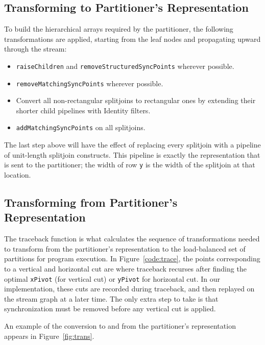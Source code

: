 \subsection{Transforming to Partitioner's Representation}

To build the hierarchical arrays required by the partitioner, the
following transformations are applied, starting from the leaf nodes
and propagating upward through the stream:
\begin{itemize}

\item {\tt raiseChildren} and {\tt removeStructuredSyncPoints}
wherever possible.

\item {\tt removeMatchingSyncPoints} wherever possible.

\item Convert all non-rectangular splitjoins to rectangular ones by
extending their shorter child pipelines with Identity filters.

\item {\tt addMatchingSyncPoints} on all splitjoins.
\end{itemize}

The last step above will have the effect of replacing every splitjoin
with a pipeline of unit-length splitjoin constructs.  This pipeline is
exactly the representation that is sent to the partitioner; the width
of row {\tt y} is the width of the splitjoin at that location.  

\subsection{Transforming from Partitioner's Representation}

The traceback function is what calculates the sequence of
transformations needed to transform from the partitioner's
representation to the load-balanced set of partitions for program
execution.  In Figure~\ref{code:trace}, the points corresponding to a
vertical and horizontal cut are where traceback recurses after finding
the optimal {\tt xPivot} (for vertical cut) or {\tt yPivot} for
horizontal cut.  In our implementation, these cuts are recorded during
traceback, and then replayed on the stream graph at a later time.  The
only extra step to take is that synchronization must be removed before
any vertical cut is applied.

An example of the conversion to and from the partitioner's
representation appears in Figure~\ref{fig:trans}.

